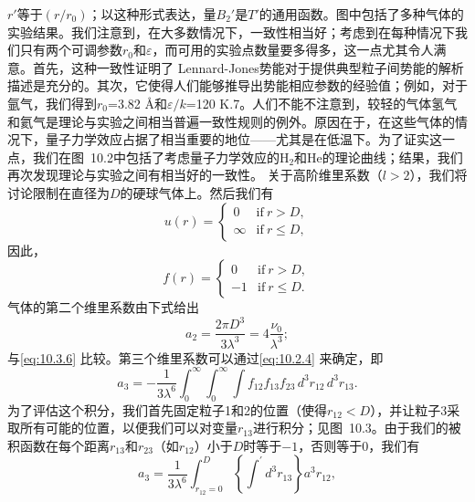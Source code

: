 \(r'\)等于\((r/r_0)\)；以这种形式表达，量\(B_2'\)是\(T'\)的通用函数。图中包括了多种气体的实验结果。我们注意到，在大多数情况下，一致性相当好；考虑到在每种情况下我们只有两个可调参数\(r_0\)和\(\varepsilon\)，而可用的实验点数量要多得多，这一点尤其令人满意。首先，这种一致性证明了
Lennard-Jones势能对于提供典型粒子间势能的解析描述是充分的。其次，它使得人们能够推导出势能相应参数的经验值；例如，对于氩气，我们得到\(r_{0}\)=3.82 Å和\(\varepsilon/k\)=120 K.7。人们不能不注意到，较轻的气体氢气和氦气是理论与实验之间相当普遍一致性规则的例外。原因在于，在这些气体的情况下，量子力学效应占据了相当重要的地位——尤其是在低温下。为了证实这一点，我们在图~10.2中包括了考虑量子力学效应的H\(_{2}\)和He的理论曲线；结果，我们再次发现理论与实验之间有相当好的一致性。
关于高阶维里系数（\(l > 2\)），我们将讨论限制在直径为\(D\)的硬球气体上。然后我们有
\begin{equation}\tag{10.3.14}\label{eq:10.3.14}
u ( r ) = \left\{ \begin{array}{ll} { { 0 } } & { { \mathrm { i f ~ } r > D , } } \\{ { \infty } } & { { \mathrm { i f ~ } r \leq D , } } \end{array} \right.
\end{equation}
因此，
\begin{equation}\tag{10.3.15}\label{eq:10.3.15}
f ( r ) = \left\{ \begin{array}{ll} { 0 } & { \mathrm { i f ~ } r > D , } \\{ - 1 } & { \mathrm { i f ~ } r \leq D . } \end{array} \right.
\end{equation}
气体的第二个维里系数由下式给出
\begin{equation}\tag{10.3.16}\label{eq:10.3.16}
a _ { 2 } = \frac { 2 \pi D ^{3} } { 3 \lambda ^{3} } = 4 \frac { \nu _ { 0 } } { \lambda ^{3} } ;
\end{equation}
与\autoref{eq:10.3.6} 比较。第三个维里系数可以通过\autoref{eq:10.2.4} 来确定，即
\begin{equation}\tag{10.3.17}\label{eq:10.3.17}
a _ { 3 } = - \frac { 1 } { 3 \lambda ^{6} } \int _ { 0 } ^{\infty}   \int _ { 0 } ^{\infty}    \int f _ { 12 } f _ { 13 } f _ { 23 } \, d ^{3} r _ { 12 } \, d ^{3} r _ { 13 } .
\end{equation}
为了评估这个积分，我们首先固定粒子1和2的位置（使得\(r_{12} < D\)），并让粒子3采取所有可能的位置，以便我们可以对变量\(r_{13}\)进行积分；见图~10.3。由于我们的被积函数在每个距离\(r_{13}\)和\(r_{23}\)（如\(r_{12}\)）小于\(D\)时等于\(-1\)，否则等于0，我们有
\begin{equation}\tag{10.3.18}\label{eq:10.3.18}
a _ { 3 } = \frac { 1 } { 3 \lambda ^{6} } \int _ { r _ { 12 } = 0 } ^{D} \left\{ \int ^{\prime} d ^{3} r _ { 13 } \right\} a ^{3} r _ { 12 } ,
\end{equation}
